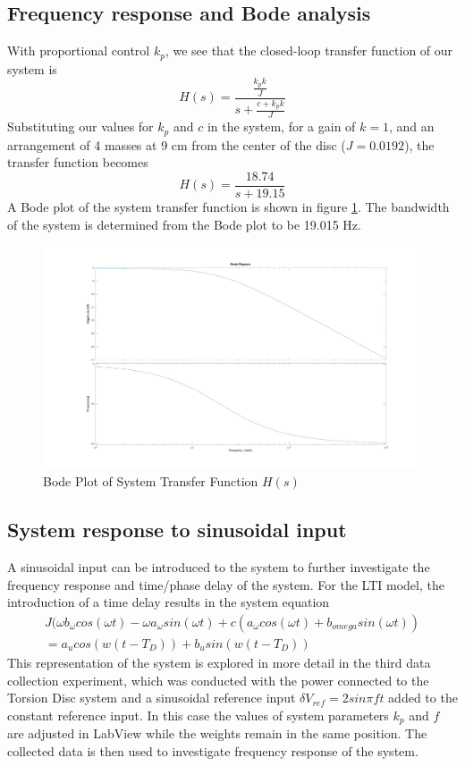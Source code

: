 \documentclass[11pt,titlepage]{article}
\begin{document}
    \subsection{Frequency response and Bode analysis}
        With proportional control $k_p$, we see that the closed-loop transfer function of our system is 
        \begin{equation}
            H(s)=\frac{\frac{k_pk}{J}}{s+\frac{c+k_pk}{J}}
        \end{equation}
        Substituting our values for $k_p$ and $c$ in the system, for a gain of $k=1$, and an arrangement of 4 masses at 9 cm from the center of the disc ($J = 0.0192$), the transfer function becomes 
        \begin{equation}
            H(s)=\frac{18.74}{s + 19.15}
        \end{equation}
        A Bode plot of the system transfer function is shown in figure \ref{fig:bode_Hs}. The bandwidth of the system is determined from the Bode plot to be 19.015 Hz.
        \begin{figure}[h!]
            \centering
            \includegraphics[scale=0.15]{bode_Hs}
            \caption{Bode Plot of System Transfer Function $H(s)$}
            \label{fig:bode_Hs}
        \end{figure}
    \subsection{System response to sinusoidal input}
        A sinusoidal input can be introduced to the system to further investigate the frequency response and time/phase delay of the system. For the LTI model, the introduction of a time delay results in the system equation 
        \begin{multline}
            J(\omega b_{\omega}cos(\omega t)-\omega a_{\omega}sin(\omega t)+c(a_{\omega}cos(\omega t)+b_{omega}sin(\omega t))\\
            = a_ucos(w(t-T_D))+b_usin(w(t-T_D))
        \end{multline}
        This representation of the system is explored in more detail in the third data collection experiment, which was conducted with the power connected to the Torsion Disc system and a sinusoidal reference input $\delta V_{ref}=2sin\pi ft$ added to the constant reference input. In this case the values of system parameters $k_p$ and $f$ are adjusted in LabView while the weights remain in the same position. The collected data is then used to investigate frequency response of the system.
\end{document}
